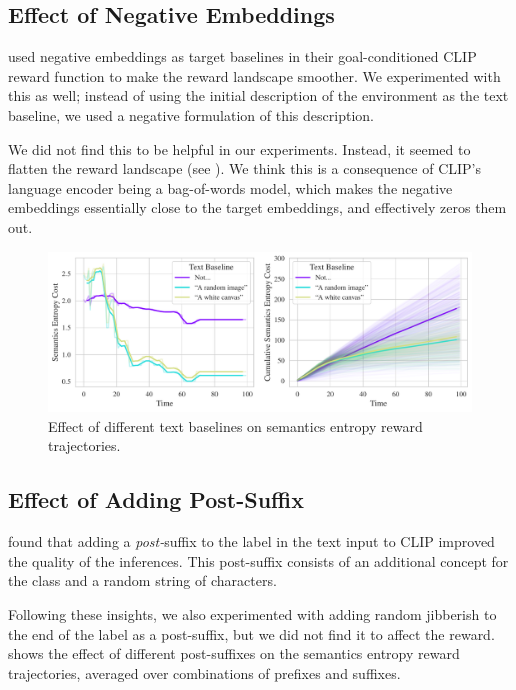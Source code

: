 \subsection{Effect of Negative Embeddings}
\label{sec:negative-embeddings}
\cite{negprompt} used negative embeddings as target baselines in their goal-conditioned CLIP reward function to make the reward landscape smoother.
We experimented with this as well; instead of using the initial description of the environment as the text baseline, we used a negative formulation of this description.

We did not find this to be helpful in our experiments.
Instead, it seemed to flatten the reward landscape (see ).
We think this is a consequence of CLIP's language encoder being a bag-of-words model, which makes the negative embeddings essentially close to the target embeddings, and effectively zeros them out.

\begin{figure}[h]
    \centering
    \includegraphics[width=\textwidth]{images/baseline_comparison.pdf}
    \caption{Effect of different text baselines on semantics entropy reward trajectories.}
    \label{fig:baseline}
\end{figure}

\subsection{Effect of Adding Post-Suffix}
\label{sec:post-suffix}
\cite{waffleclip} found that adding a \emph{post-}suffix to the label in the text input to CLIP improved the quality of the inferences.
This post-suffix consists of an additional concept for the class and a random string of characters.

Following these insights, we also experimented with adding random jibberish to the end of the label as a post-suffix, but we did not find it to affect the reward.
 shows the effect of different post-suffixes on the semantics entropy reward trajectories, averaged over combinations of prefixes and suffixes.

